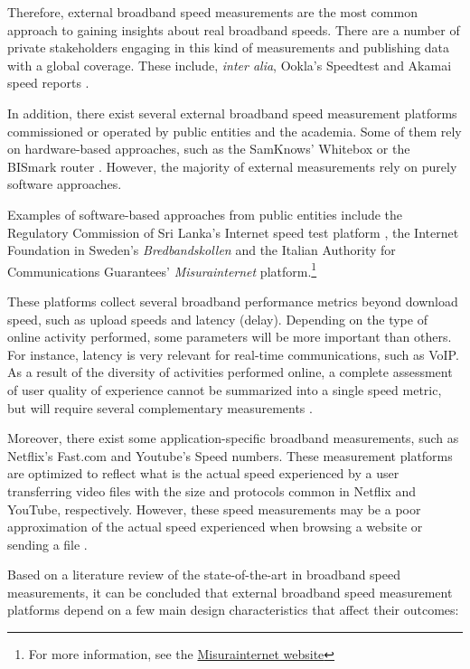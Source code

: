 \documentclass[12pt]{article}
\begin{document}
Therefore, external broadband speed measurements are the most common approach to gaining insights about real broadband speeds. There are a number of private stakeholders engaging in this kind of measurements and publishing data with a global coverage. These include, \textit{inter alia}, Ookla's Speedtest and Akamai speed reports \citep{bauer2010,lehr2013,bauer2016}. 

In addition, there exist several external broadband speed measurement platforms commissioned or operated by public entities and the academia. Some of them rely on hardware-based approaches, such as the SamKnows' Whitebox \citep{samknows2012,samknows2013} or the BISmark router \citep{sundaresan2012,sundaresan2014,chetty2013}. However, the majority of external measurements rely on purely software approaches. 

Examples of software-based approaches from public entities include the Regulatory Commission of Sri Lanka's Internet speed test platform \citep{zuhyle2015}, the Internet Foundation in Sweden's \textit{Bredbandskollen} and the Italian Authority for Communications Guarantees' \textit{Misurainternet} platform.\footnote{For more information, see the \href{https://www.misurainternet.it/}{Misurainternet website}}

These platforms collect several broadband performance metrics beyond download speed, such as upload speeds and latency (delay). Depending on the type of online activity performed, some parameters will be more important than others. For instance, latency is very relevant for real-time communications, such as VoIP. As a result of the diversity of activities performed online, a complete assessment of user quality of experience cannot be summarized into a single speed metric, but will require several complementary measurements \citep{samknows2013,zuhyle2015, wattegama2011}. 

Moreover, there exist some application-specific broadband measurements, such as Netflix's Fast.com and Youtube's Speed numbers. These measurement platforms are optimized to reflect what is the actual speed experienced by a user transferring video files with the size and protocols common in Netflix and YouTube, respectively. However, these speed measurements may be a poor approximation of the actual speed experienced when browsing a website or sending a file \citep{bauer2010, bauer2016}.         

Based on a literature review of the state-of-the-art in broadband speed measurements, it can be concluded that external broadband speed measurement platforms depend on a few main design characteristics that affect their outcomes:
\end{document}
